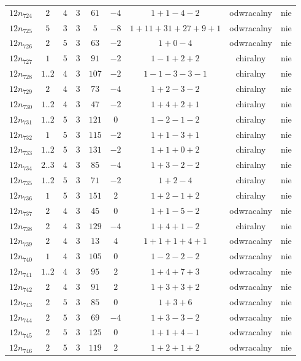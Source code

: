 \begin{longtable}{ccccccccc}
$12n_{724}$ & $2$ & $4$ & $3$ & $61$ & $-4$ & $1+1-4-2$ & odwracalny & nie \\
$12n_{725}$ & $5$ & $3$ & $3$ & $5$ & $-8$ & $1+11+31+27+9+1$ & odwracalny & nie \\
$12n_{726}$ & $2$ & $5$ & $3$ & $63$ & $-2$ & $1+0-4$ & odwracalny & nie \\
$12n_{727}$ & $1$ & $5$ & $3$ & $91$ & $-2$ & $1-1+2+2$ & chiralny & nie \\
$12n_{728}$ & $1..2$ & $4$ & $3$ & $107$ & $-2$ & $1-1-3-3-1$ & chiralny & nie \\
$12n_{729}$ & $2$ & $4$ & $3$ & $73$ & $-4$ & $1+2-3-2$ & chiralny & nie \\
$12n_{730}$ & $1..2$ & $4$ & $3$ & $47$ & $-2$ & $1+4+2+1$ & chiralny & nie \\
$12n_{731}$ & $1..2$ & $5$ & $3$ & $121$ & $0$ & $1-2-1-2$ & chiralny & nie \\
$12n_{732}$ & $1$ & $5$ & $3$ & $115$ & $-2$ & $1+1-3+1$ & chiralny & nie \\
$12n_{733}$ & $1..2$ & $5$ & $3$ & $131$ & $-2$ & $1+1+0+2$ & chiralny & nie \\
$12n_{734}$ & $2..3$ & $4$ & $3$ & $85$ & $-4$ & $1+3-2-2$ & chiralny & nie \\
$12n_{735}$ & $1..2$ & $5$ & $3$ & $71$ & $-2$ & $1+2-4$ & chiralny & nie \\
$12n_{736}$ & $1$ & $5$ & $3$ & $151$ & $2$ & $1+2-1+2$ & chiralny & nie \\
$12n_{737}$ & $2$ & $4$ & $3$ & $45$ & $0$ & $1+1-5-2$ & odwracalny & nie \\
$12n_{738}$ & $2$ & $4$ & $3$ & $129$ & $-4$ & $1+4+1-2$ & chiralny & nie \\
$12n_{739}$ & $2$ & $4$ & $3$ & $13$ & $4$ & $1+1+1+4+1$ & odwracalny & nie \\
$12n_{740}$ & $1$ & $4$ & $3$ & $105$ & $0$ & $1-2-2-2$ & odwracalny & nie \\
$12n_{741}$ & $1..2$ & $4$ & $3$ & $95$ & $2$ & $1+4+7+3$ & odwracalny & nie \\
$12n_{742}$ & $2$ & $4$ & $3$ & $91$ & $2$ & $1+3+3+2$ & odwracalny & nie \\
$12n_{743}$ & $2$ & $5$ & $3$ & $85$ & $0$ & $1+3+6$ & odwracalny & nie \\
$12n_{744}$ & $2$ & $5$ & $3$ & $69$ & $-4$ & $1+3-3-2$ & odwracalny & nie \\
$12n_{745}$ & $2$ & $5$ & $3$ & $125$ & $0$ & $1+1+4-1$ & odwracalny & nie \\
$12n_{746}$ & $2$ & $5$ & $3$ & $119$ & $2$ & $1+2+1+2$ & odwracalny & nie \\

\end{longtable}
